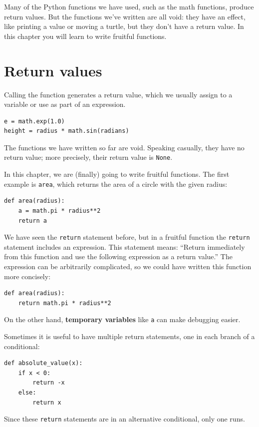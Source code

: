 \documentclass[10pt]{book}
\begin{document}
Many of the Python functions we have used, such as the math
functions, produce return values.  But the functions we've written
are all void: they have an effect, like printing a value
or moving a turtle, but they don't have a return value.  In
this chapter you will learn to write fruitful functions.


\section{Return values}

Calling the function generates a return
value, which we usually assign to a variable or use as part of an
expression.

\begin{verbatim}
e = math.exp(1.0)
height = radius * math.sin(radians)
\end{verbatim}
%
The functions we have written so far are void.  Speaking casually,
they have no return value; more precisely,
their return value is {\tt None}.

In this chapter, we are (finally) going to write fruitful functions.
The first example is {\tt area}, which returns the area of a circle
with the given radius:

\begin{verbatim}
def area(radius):
    a = math.pi * radius**2
    return a
\end{verbatim}
%
We have seen the {\tt return} statement before, but in a fruitful
function the {\tt return} statement includes
an expression.  This statement means: ``Return immediately from
this function and use the following expression as a return value.''
The expression can be arbitrarily complicated, so we could
have written this function more concisely:

\begin{verbatim}
def area(radius):
    return math.pi * radius**2
\end{verbatim}
%
On the other hand, {\bf temporary variables} like {\tt a} can make
debugging easier.

Sometimes it is useful to have multiple return statements, one in each
branch of a conditional:

\begin{verbatim}
def absolute_value(x):
    if x < 0:
        return -x
    else:
        return x
\end{verbatim}
%
Since these {\tt return} statements are in an alternative conditional,
only one runs.
\end{document}

